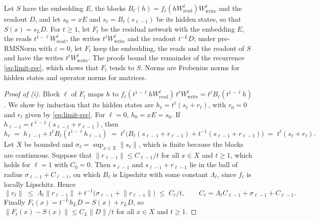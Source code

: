 \documentclass[10pt]{article}
\theoremstyle{definition}
\theoremstyle{remark}
\newcommand{\Wread}{W_{\mathrm{read}}}
\newcommand{\Wwrite}{W_{\mathrm{write}}}
\newcommand{\norm}[1]{\lVert #1\rVert}
\begin{document}
\propLimits*

Let $S$ have the embedding $E$, the blocks $B_\ell(h) = f_\ell(h\Wread^{\ell})\Wwrite^{\ell}$ and the readout $D$, and let $s_0 = xE$ and $s_\ell = B_\ell(s_{\ell-1})$ be its hidden states, so that $S(x) = s_LD$. For $t \ge 1$, let $F_t$ be the residual network with the embedding $E$, the reads $t^{1-\ell}\Wread^{\ell}$, the writes $t^{\ell}\Wwrite^{\ell}$ and the readout $t^{-L}D$; under pre-RMSNorm with $\varepsilon = 0$, let $F_t$ keep the embedding, the reads and the readout of $S$ and have the writes $t^{\ell}\Wwrite^{\ell}$. The proofs bound the remainder of the recurrence \cref{eq:limit-rec}, which shows that $F_t$ tends to $S$. Norms are Frobenius norms for hidden states and operator norms for matrices.

\begin{proof}[Proof of (i)]
Block $\ell$ of $F_t$ maps $h$ to $f_\ell(t^{1-\ell}h\Wread^{\ell})\,t^\ell\Wwrite^{\ell} = t^\ell B_\ell(t^{1-\ell}h)$. We show by induction that its hidden states are $h_\ell = t^\ell(s_\ell + r_\ell)$, with $r_0 = 0$ and $r_\ell$ given by \cref{eq:limit-rec}. For $\ell = 0$, $h_0 = xE = s_0$. If $h_{\ell-1} = t^{\ell-1}(s_{\ell-1} + r_{\ell-1})$, then
\[
h_\ell \;=\; h_{\ell-1} + t^\ell B_\ell(t^{1-\ell}h_{\ell-1}) \;=\; t^\ell\big(B_\ell(s_{\ell-1} + r_{\ell-1}) + t^{-1}(s_{\ell-1} + r_{\ell-1})\big) \;=\; t^\ell(s_\ell + r_\ell).
\]
Let $X$ be bounded and $\sigma_\ell = \sup_{x \in X}\norm{s_\ell}$, which is finite because the blocks are continuous. Suppose that $\norm{r_{\ell-1}} \le C_{\ell-1}/t$ for all $x \in X$ and $t \ge 1$, which holds for $\ell = 1$ with $C_0 = 0$. Then $s_{\ell-1}$ and $s_{\ell-1} + r_{\ell-1}$ lie in the ball of radius $\sigma_{\ell-1} + C_{\ell-1}$, on which $B_\ell$ is Lipschitz with some constant $\Lambda_\ell$, since $f_\ell$ is locally Lipschitz. Hence
\[
\norm{r_\ell} \;\le\; \Lambda_\ell\norm{r_{\ell-1}} + t^{-1}\big(\sigma_{\ell-1} + \norm{r_{\ell-1}}\big) \;\le\; C_\ell/t, \qquad C_\ell = \Lambda_\ell C_{\ell-1} + \sigma_{\ell-1} + C_{\ell-1}.
\]
Finally $F_t(x) = t^{-L}h_LD = S(x) + r_LD$, so $\norm{F_t(x) - S(x)} \le C_L\norm{D}/t$ for all $x \in X$ and $t \ge 1$.
\end{proof}
\end{document}
